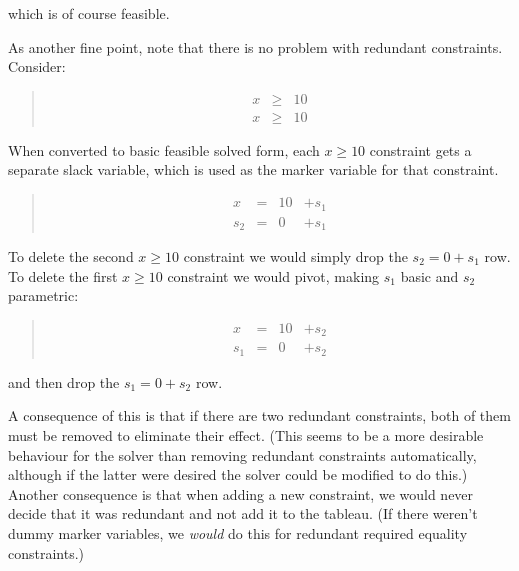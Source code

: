 \documentclass{article}
\begin{document}
which is of course feasible.

As another fine point, note that there is no problem with redundant
constraints.  Consider:

\begin{quote}\vspace*{-1ex}
$$
\begin{array}{rlrrr} 
x & \geq & 10   \\
x & \geq & 10 
\end{array}
$$
\end{quote}\vspace{-0.9ex}

When converted to basic feasible solved form, each $x \geq 10$ constraint
gets a separate slack variable, which is used as the marker variable for
that constraint.


\begin{quote}\vspace*{-1ex}
$$
\begin{array}{rlrrr} 
x & = & 10 & + s_1   \\ \hline
s_2 & = & 0 & + s_1 
\end{array}
$$
\end{quote}\vspace{-0.9ex}

To delete the second $x \geq 10$ constraint we would simply drop
the $s_2 = 0 + s_1$ row.  To delete the first  $x \geq 10$ constraint we
would pivot, making $s_1$ basic and $s_2$ parametric:

\begin{quote}\vspace*{-1ex}
$$
\begin{array}{rlrrr}
x & = & 10 & + s_2   \\ \hline
s_1 & = & 0 & + s_2
\end{array}
$$
\end{quote}\vspace{-0.9ex}

and then drop the  $s_1 = 0 + s_2$ row.

A consequence of this is that if there are two redundant constraints, both
of them must be removed to eliminate their effect.  (This seems to be a
more desirable behaviour for the solver than removing redundant constraints
automatically, although if the latter were desired the solver could be
modified to do this.)  Another consequence is that when adding a new
constraint, we would never decide that it was redundant and not add it to
the tableau.  (If there weren't dummy marker variables, we {\em would} do this
for redundant required equality constraints.)
\end{document}
